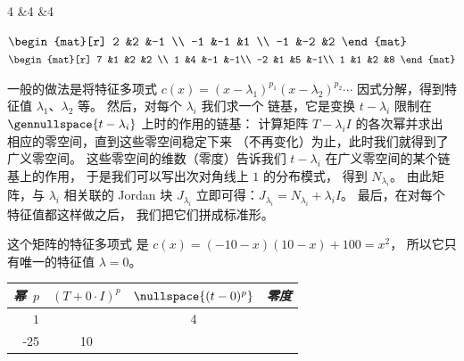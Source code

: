 \begin{exercises}
\begin{exparts*}
\begin{mat}[r]
           4   &4    &4
        \end{mat} \)
      \partsitem 
        \(
        \begin{mat}[r]
           2   &2    &-1 \\
          -1   &-1   &1  \\
          -1   &-2   &2
        \end{mat} \)
      \partsitem 
        \(
        \begin{mat}[r]
           7   &1    &2   &2 \\
           1   &4    &-1  &-1\\
          -2   &1    &5   &-1\\
           1   &1    &2   &8
        \end{mat} \)
    \end{exparts*}
    \begin{answer}
      一般的做法是将特征多项式 
      $c(x)=(x-\lambda_1)^{p_1}(x-\lambda_2)^{p_2}\cdots $ 
      因式分解，得到特征值 $\lambda_1$、$\lambda_2$ 等。 
      然后，对每个 $\lambda_i$ 我们求一个
      链基，它是变换 $t-\lambda_i$
      限制在 $\gennullspace{t-\lambda_i}$ 上时的作用的链基：
      计算矩阵 $T-\lambda_iI$ 的各次幂并求出
      相应的零空间，直到这些零空间稳定下来
      （不再变化）为止，此时我们就得到了广义零空间。
      这些零空间的维数（零度）告诉我们
      $t-\lambda_i$ 在广义零空间的某个链基上的作用，
      于是我们可以写出次对角线上 $1$ 的分布模式，
      得到 $N_{\lambda_i}$。
      由此矩阵，与 $\lambda_i$ 相关联的 Jordan 块
      $J_{\lambda_i}$ 立即可得：$J_{\lambda_i}=N_{\lambda_i}+\lambda_iI$。
      最后，在对每个特征值都这样做之后，
      我们把它们拼成标准形。
      \begin{exparts}
        \partsitem 这个矩阵的特征多项式
           是 $c(x)=(-10-x)(10-x)+100=x^2$， 
           所以它只有唯一的特征值 $\lambda=0$。
           \begin{center}
             \renewcommand{\arraystretch}{1.25}
             \begin{tabular}{r|ccc}
                \multicolumn{1}{c}{\textit{幂}~$p$} 
                    &$(T+0\cdot I)^p$ &$\nullspace{(t-0)^p}$
                    &\textit{零度}                   \\ 
                \hline
                $1$  
                &\matrixvenlarge{\begin{mat}[r]
                  -10  &4  \\ 
                  -25  &10
                \end{mat}}

\end{tabular}
\end{center}
\end{exparts}
\end{answer}
\end{exercises}
